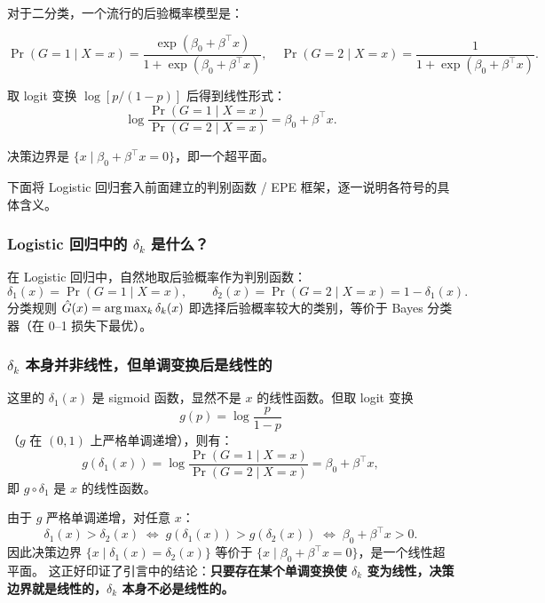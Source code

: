 对于二分类，一个流行的后验概率模型是：

\begin{equation}\label{eq:logistic_posterior}
    \Pr(G = 1 \mid X = x) = \frac{\exp(\beta_0 + \beta^\top x)}{1 + \exp(\beta_0 + \beta^\top x)},
    \quad
    \Pr(G = 2 \mid X = x) = \frac{1}{1 + \exp(\beta_0 + \beta^\top x)}.
\end{equation}

取 logit 变换 $\log[p/(1-p)]$ 后得到线性形式：
\begin{equation}\label{eq:logit_linear}
    \log\frac{\Pr(G = 1 \mid X = x)}{\Pr(G = 2 \mid X = x)} = \beta_0 + \beta^\top x.
\end{equation}

决策边界是 $\{x \mid \beta_0 + \beta^\top x = 0\}$，即一个超平面。

下面将 Logistic 回归套入前面建立的判别函数 / EPE 框架，逐一说明各符号的具体含义。

\subsubsection{Logistic 回归中的 $\delta_k$ 是什么？}

在 Logistic 回归中，自然地取后验概率作为判别函数：
\[
\delta_1(x) = \Pr(G = 1 \mid X = x), \qquad
\delta_2(x) = \Pr(G = 2 \mid X = x) = 1 - \delta_1(x).
\]
分类规则 $\hat{G}(x) = \arg\max_k \delta_k(x)$ 即选择后验概率较大的类别，等价于 Bayes 分类器（在 0--1 损失下最优）。

\subsubsection{$\delta_k$ 本身并非线性，但单调变换后是线性的}

这里的 $\delta_1(x)$ 是 sigmoid 函数，显然不是 $x$ 的线性函数。但取 logit 变换
\[
g(p) = \log\frac{p}{1-p}
\]
（$g$ 在 $(0,1)$ 上严格单调递增），则有：
\[
g(\delta_1(x)) = \log\frac{\Pr(G=1\mid X=x)}{\Pr(G=2\mid X=x)} = \beta_0 + \beta^\top x,
\]
即 $g \circ \delta_1$ 是 $x$ 的线性函数。

由于 $g$ 严格单调递增，对任意 $x$：
\[
\delta_1(x) > \delta_2(x)
\;\Longleftrightarrow\;
g(\delta_1(x)) > g(\delta_2(x))
\;\Longleftrightarrow\;
\beta_0 + \beta^\top x > 0.
\]
因此决策边界 $\{x \mid \delta_1(x) = \delta_2(x)\}$ 等价于 $\{x \mid \beta_0 + \beta^\top x = 0\}$，是一个线性超平面。
这正好印证了引言中的结论：\textbf{只要存在某个单调变换使 $\delta_k$ 变为线性，决策边界就是线性的，$\delta_k$ 本身不必是线性的。}

